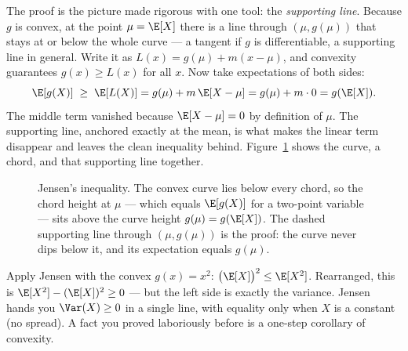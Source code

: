 \begin{whybox}
The proof is the picture made rigorous with one tool: the \emph{supporting
line}. Because $g$ is convex, at the point $\mu = \E[X]$ there is a line
through $(\mu, g(\mu))$ that stays at or below the whole curve --- a tangent if
$g$ is differentiable, a supporting line in general. Write it as
$L(x) = g(\mu) + m(x - \mu)$, and convexity guarantees $g(x) \ge L(x)$ for all
$x$. Now take expectations of both sides:
\[
  \E[g(X)] \;\ge\; \E[L(X)]
  = g(\mu) + m\,\E[X - \mu]
  = g(\mu) + m\cdot 0
  = g(\E[X]).
\]
The middle term vanished because $\E[X-\mu] = 0$ by definition of $\mu$. The
supporting line, anchored exactly at the mean, is what makes the linear term
disappear and leaves the clean inequality behind.
Figure~\ref{ch19:fig-jensen} shows the curve, a chord, and that supporting line
together.
\end{whybox}

\begin{figure}[H]
\centering
{}
\caption{Jensen's inequality. The convex curve lies below every chord, so the
chord height at $\mu$ --- which equals $\E[g(X)]$ for a two-point variable ---
sits above the curve height $g(\mu) = g(\E[X])$. The dashed supporting line
through $(\mu, g(\mu))$ is the proof: the curve never dips below it, and its
expectation equals $g(\mu)$.}
\label{ch19:fig-jensen}
\end{figure}

\begin{example}
\label{ch19:ex-jensen-var}
Apply Jensen with the convex $g(x) = x^2$:
$\bigl(\E[X]\bigr)^2 \le \E[X^2]$. Rearranged, this is
$\E[X^2] - (\E[X])^2 \ge 0$ --- but the left side is exactly the variance.
Jensen hands you $\Var(X) \ge 0$ in a single line, with equality only when $X$
is a constant (no spread). A fact you proved laboriously before is a one-step
corollary of convexity.
\end{example}

